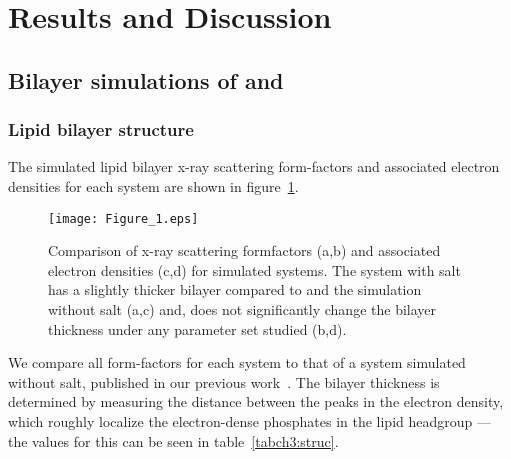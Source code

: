 \section{Results and Discussion}
\subsection{Bilayer simulations of \li{} and \mg{}}
\subsubsection{Lipid bilayer structure}
The simulated lipid bilayer x-ray scattering form-factors and associated 
electron densities for each system are shown in figure~\ref{figch3:eledens}.
\begin{figure}[H]
    \caption[Comparison of SAXS formfactors]{Comparison of x-ray scattering formfactors (a,b) and associated electron densities (c,d) for simulated systems. 
    {The system with \li{} salt has a slightly thicker bilayer compared to \na{} and the simulation without salt (a,c) and},
    \mg{} does not significantly change the bilayer thickness
    under any parameter set studied (b,d). }
    \label{figch3:eledens}
    \texttt{[image: Figure\_1.eps]}
\end{figure}
We compare all form-factors for each system to that of a system simulated without salt, published
in our previous work~\cite{kruczek:2017}.
The bilayer thickness \dhh{} is determined by measuring the distance between the
peaks in the electron density, which roughly localize the electron-dense phosphates in the
lipid headgroup --- the values for this can be seen in table~\ref{tabch3:struc}.
